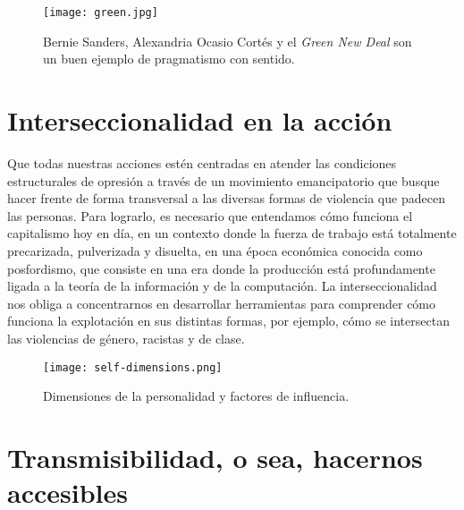 \begin{figure}[htbp]
	\centering
	\texttt{[image: green.jpg]}
	\caption[Buen ejemplo de pragmatismo con sentido.]{Bernie Sanders, Alexandria Ocasio Cortés y el \emph{Green New Deal} son un buen ejemplo de pragmatismo con sentido.}
\end{figure}

\section{Interseccionalidad en la acción}
\label{sec:interseccionalidad}

Que todas nuestras acciones estén centradas en atender las condiciones estructurales de opresión a través de un movimiento emancipatorio que busque hacer frente de forma transversal a las diversas formas de violencia que padecen las personas. Para lograrlo, es necesario que entendamos cómo funciona el capitalismo hoy en día, en un contexto donde la fuerza de trabajo está totalmente precarizada, pulverizada y disuelta, en una época económica conocida como posfordismo, que consiste en una era donde la producción está profundamente ligada a la teoría de la información y de la computación. La interseccionalidad nos obliga a concentrarnos en desarrollar herramientas para comprender cómo funciona la explotación en sus distintas formas, por ejemplo, cómo se intersectan las violencias de género, racistas y de clase.

\begin{figure}[htbp]
	\centering
	\texttt{[image: self-dimensions.png]}
	\caption[Dimensiones de la personalidad.]{Dimensiones de la personalidad y factores de influencia.}
	\label{fig:dimensiones}
\end{figure}

\section{Transmisibilidad, o sea, hacernos accesibles}
\label{sec:transmisibilidad}

